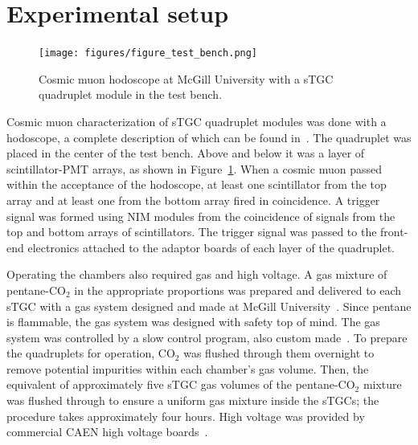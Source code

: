 \section{Experimental setup}

\begin{figure}[h]
    \centering
    \texttt{[image: figures/figure\_test\_bench.png]}
    \caption{Cosmic muon hodoscope at McGill University with a sTGC quadruplet module in the test bench.}
    \label{fig:hodoscope}
\end{figure}

Cosmic muon characterization of sTGC quadruplet modules was done with a hodoscope, a complete description of which can be found in~\cite{lefebvre_thesis}. The quadruplet was placed in the center of the test bench. Above and below it was a layer of scintillator-PMT arrays, as shown in Figure~\ref{fig:hodoscope}. When a cosmic muon passed within the acceptance of the hodoscope, at least one scintillator from the top array and at least one from the bottom array fired in coincidence. A trigger signal was formed using NIM modules from the coincidence of signals from the top and bottom arrays of scintillators. The trigger signal was passed to the front-end electronics attached to the adaptor boards of each layer of the quadruplet.

Operating the chambers also required gas and high voltage. A gas mixture of pentane-CO$_{2}$ in the appropriate proportions was prepared and delivered to each sTGC with a gas system designed and made at McGill University~\cite{keyes_development_2017}. Since pentane is flammable, the gas system was designed with safety top of mind. The gas system was controlled by a slow control program, also custom made~\cite{keyes_development_2017}. To prepare the quadruplets for operation, CO$_{2}$ was flushed through them overnight to remove potential impurities within each chamber's gas volume. Then, the equivalent of approximately five sTGC gas volumes of the pentane-CO$_{2}$ mixture was flushed through to ensure a uniform gas mixture inside the sTGCs; the procedure takes approximately four hours. High voltage was provided by commercial CAEN high voltage boards~\cite{keyes_development_2017}. 


